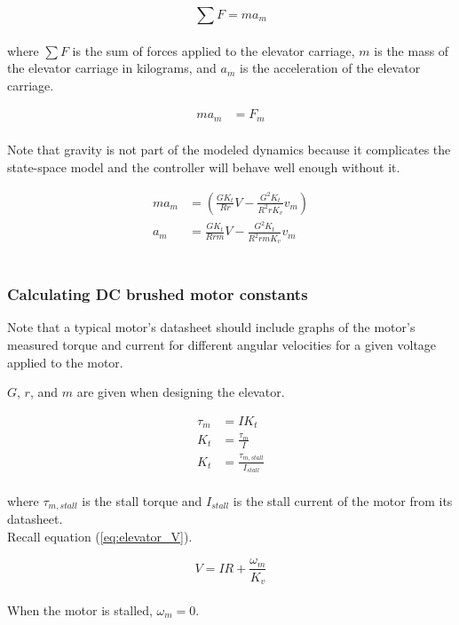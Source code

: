 \begin{equation}
  \sum F = ma_m \label{eq:elevator_F_ma}
\end{equation}
\\
where $\sum F$ is the sum of forces applied to the elevator carriage, $m$ is
the mass of the elevator carriage in kilograms, and $a_m$ is the acceleration of
the elevator carriage.

\begin{align}
  ma_m &= F_m \nonumber
\end{align}
\\
Note that gravity is not part of the modeled dynamics because it complicates the
state-space model and the controller will behave well enough without it.

\begin{align}
  ma_m &= \left(\frac{GK_t}{Rr} V - \frac{G^2K_t}{R^2 rK_v} v_m\right)
    \nonumber \\
  a_m &= \frac{GK_t}{Rrm} V - \frac{G^2K_t}{R^2 rmK_v} v_m
    \label{eq:elevator_accel}
\end{align}
\\
\subsubsection{Calculating DC brushed motor constants}

Note that a typical motor's datasheet should include graphs of the motor's
measured torque and current for different angular velocities for a given voltage
applied to the motor.

$G$, $r$, and $m$ are given when designing the elevator.

\begin{align}
  \tau_m &= I K_t \nonumber \\
  K_t &= \frac{\tau_m}{I} \nonumber \\
  K_t &= \frac{\tau_{m,stall}}{I_{stall}}
\end{align}
\\
where $\tau_{m,stall}$ is the stall torque and $I_{stall}$ is the stall current
of the motor from its datasheet. \\

Recall equation (\ref{eq:elevator_V}).

\begin{equation*}
  V = IR + \frac{\omega_m}{K_v}
\end{equation*}
\\
When the motor is stalled, $\omega_m = 0$.

